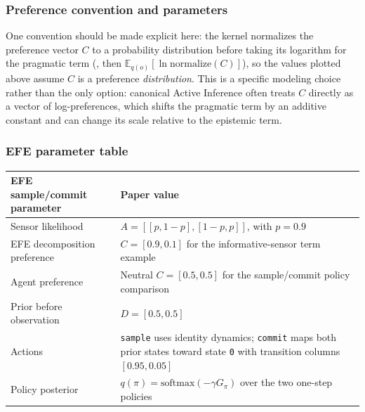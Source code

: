 \documentclass[
  english,
]{article}
\newcounter{none} %
\begin{document}
\subsubsection{Preference convention and
parameters}\label{preference-convention-and-parameters}

One convention should be made explicit here: the kernel normalizes the
preference vector \(C\) to a probability distribution before taking its
logarithm for the pragmatic term (,
then \(\mathbb{E}_{q(o)}[\ln \mathrm{normalize}(C)]\)), so the values
plotted above assume \(C\) is a preference \emph{distribution}. This is
a specific modeling choice rather than the only option: canonical Active
Inference often treats \(C\) directly as a vector of log-preferences,
which shifts the pragmatic term by an additive constant and can change
its scale relative to the epistemic term.

\subsubsection{EFE parameter table}\label{efe-parameter-table}

{\def\LTcaptype{none} %
\begin{longtable}[]{@{}
  >{\raggedright\arraybackslash}p{}
  >{\raggedright\arraybackslash}p{}@{}}
\toprule\noalign{}
\begin{minipage}[b]{\linewidth}\raggedright
EFE sample/commit parameter
\end{minipage} & \begin{minipage}[b]{\linewidth}\raggedright
Paper value
\end{minipage} \\
\midrule\noalign{}
\endhead
\bottomrule\noalign{}
\endlastfoot
Sensor likelihood & \(A=[[p,1-p],[1-p,p]]\), with \(p=0.9\) \\
EFE decomposition preference & \(C=[0.9,0.1]\) for the
informative-sensor term example \\
Agent preference & Neutral \(C=[0.5,0.5]\) for the sample/commit policy
comparison \\
Prior before observation & \(D=[0.5,0.5]\) \\
Actions & \texttt{sample} uses identity dynamics; \texttt{commit} maps
both prior states toward state \texttt{0} with transition columns
\([0.95,0.05]\) \\
Policy posterior & \(q(\pi)=\mathrm{softmax}(-\gamma G_\pi)\) over the
two one-step policies \\
\end{longtable}
}
\end{document}
